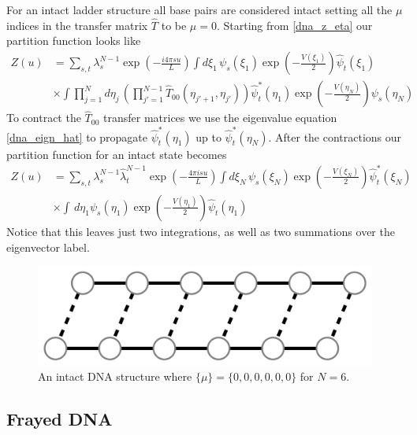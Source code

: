 For an intact ladder structure all base pairs are considered intact setting all the $\mu$ indices in the transfer matrix $\hat{T}$ to be $\mu=0$. Starting from \eqref{dna_z_eta} our partition function looks like
%
\begin{align}
Z\left(u\right)&=\sum_{s,t}\lambda_{s}^{N-1}\exp\left(-\frac{i4\pi s u}{L}\right)\int d\xi_{1}\,\psi_{s}\left(\xi_{1}\right)\exp\left(-\frac{V\left(\xi_{1}\right)}{2}\right)\hat{\psi}_{t}\left(\xi_{1}\right)\nonumber\\
&\times\int \prod_{j=1}^{N}d\eta_{j}\,\left(\prod_{j'=1}^{N-1}\hat{T}_{00}\left(\eta_{j'+1},\eta_{j'}\right)\right)\hat{\psi}^{*}_{t}\left(\eta_{1}\right)\exp\left(-\frac{V\left(\eta_{N}\right)}{2}\right)\psi_{s}\left(\eta_{N}\right)
\end{align}
%
To contract the $\hat{T}_{00}$ transfer matrices we use the eigenvalue equation \eqref{dna_eign_hat} to propagate $\hat{\psi}^{*}_{t}\left(\eta_{1}\right)$ up to $\hat{\psi}^{*}_{t}\left(\eta_{N}\right)$. After the contractions our partition function for an intact state becomes
%
\begin{align}
\label{dna_intact}
Z\left(u\right)&=\sum_{s,t}\lambda_{s}^{N-1}\hat{\lambda}_{t}^{N-1} \exp\left(-\frac{4\pi isu}{L}\right)\int d\xi_{N}\,\psi_{s}\left(\xi_{N}\right)\exp\left(-\frac{V\left(\xi_{N}\right)}{2}\right)\hat{\psi}^{*}_{t}\left(\xi_{N}\right)\nonumber\\
&\times\int\,d\eta_{1} \psi_{s}\left(\eta_{1}\right)\exp\left(-\frac{V\left(\eta_{1}\right)}{2}\right)\hat{\psi}_{t}\left(\eta_{1}\right)
\end{align}
%
Notice that this leaves just two integrations, as well as two summations over the eigenvector label.
%
\begin{figure}
\centering \includegraphics[scale=0.275]{Graphics/DNA_Model/dna_intact.pdf}
\caption{An intact DNA structure where $\{\mu\}=\{0,0,0,0,0,0\}$ for $N=6$.}
\label{fig:dna_intact}
\end{figure}
%
\subsection{Frayed DNA}

